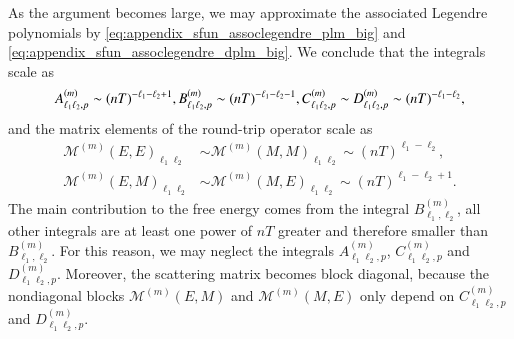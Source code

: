 As the argument becomes large, we may approximate the associated Legendre
polynomials by \eqref{eq:appendix_sfun_assoclegendre_plm_big} and
\eqref{eq:appendix_sfun_assoclegendre_dplm_big}.
We conclude that the integrals scale as
\begin{equation}
A_{\ell_1 \ell_2,p}^{(m)} \sim (nT)^{-\ell_1-\ell_2+1}, \\
B_{\ell_1 \ell_2,p}^{(m)} \sim (nT)^{-\ell_1-\ell_2-1}, \\
C_{\ell_1 \ell_2,p}^{(m)} \sim D_{\ell_1 \ell_2,p}^{(m)} \sim (nT)^{-\ell_1-\ell_2},
\end{equation}
and the matrix elements of the round-trip operator scale as
\begin{align}
\mathcal{M}^{(m)}(E,E)_{\ell_1 \ell_2} &\sim \mathcal{M}^{(m)}(M,M)_{\ell_1 \ell_2} \sim (nT)^{\ell_1-\ell_2}, \\
\mathcal{M}^{(m)}(E,M)_{\ell_1 \ell_2} &\sim \mathcal{M}^{(m)}(M,E)_{\ell_1 \ell_2} \sim (nT)^{\ell_1-\ell_2+1}.
\end{align}
The main contribution to the free energy comes from the integral $B_{\ell_1,
\ell_2}^{(m)}$, all other integrals are at least one power of $nT$ greater and
therefore smaller than $B_{\ell_1, \ell_2}^{(m)}$. For this reason, we may
neglect the integrals $A_{\ell_1 \ell_2,p}^{(m)}$, $C_{\ell_1 \ell_2,p}^{(m)}$ and
$D_{\ell_1 \ell_2,p}^{(m)}$. Moreover, the scattering matrix becomes block
diagonal, because the nondiagonal blocks $\mathcal{M}^{(m)}(E,M)$ and
$\mathcal{M}^{(m)}(M,E)$ only depend on $C_{\ell_1 \ell_2,p}^{(m)}$ and $D_{\ell_1 \ell_2,p}^{(m)}$.

